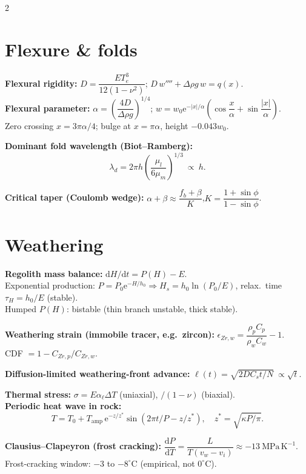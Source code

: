 \documentclass[9pt,a4paper]{extarticle}
\newcommand{\dd}{\mathrm{d}}
\newcommand{\dv}[2]{\dfrac{\dd #1}{\dd #2}}
\newcommand{\ee}{\mathrm{e}}
\begin{document}
\begin{multicols}{2}
\section{Flexure \& folds}
\begin{eqbox}
\textbf{Flexural rigidity:} $D=\dfrac{ET_e^3}{12(1-\nu^2)}$;\quad
$D\,w''''+\Delta\rho g\,w=q(x)$.\\
\textbf{Flexural parameter:} $\alpha=\left(\dfrac{4D}{\Delta\rho g}\right)^{1/4}$;\quad
$w=w_0\ee^{-|x|/\alpha}\!\left(\cos\dfrac x\alpha+\sin\dfrac{|x|}\alpha\right)$.\\
Zero crossing $x=3\pi\alpha/4$; bulge at $x=\pi\alpha$, height $-0.043w_0$.
\end{eqbox}
\begin{eqbox}
\textbf{Dominant fold wavelength (Biot--Ramberg):}
\[
\lambda_d=2\pi h\left(\dfrac{\mu_l}{6\mu_m}\right)^{1/3}\ \propto\ h.
\]
\end{eqbox}
\begin{eqbox}
\textbf{Critical taper (Coulomb wedge):}
$\alpha+\beta\approx\dfrac{f_b+\beta}{K}$,\quad $K=\dfrac{1+\sin\phi}{1-\sin\phi}$.
\end{eqbox}

\section{Weathering}
\begin{eqbox}
\textbf{Regolith mass balance:} $\dd H/\dd t=P(H)-E$.\\
Exponential production: $P=P_0\ee^{-H/h_0}\Rightarrow H_s=h_0\ln(P_0/E)$, relax.\ time $\tau_H=h_0/E$ (stable).\\
Humped $P(H)$: bistable (thin branch unstable, thick stable).
\end{eqbox}
\begin{eqbox}
\textbf{Weathering strain (immobile tracer, e.g.\ zircon):} $\epsilon_{Zr,w}=\dfrac{\rho_pC_p}{\rho_wC_w}-1$.\\
CDF $=1-C_{Zr,p}/C_{Zr,w}$.
\end{eqbox}
\begin{eqbox}
\textbf{Diffusion-limited weathering-front advance:} $\ell(t)=\sqrt{2DC_st/N}\ \propto\sqrt t$.
\end{eqbox}
\begin{eqbox}
\textbf{Thermal stress:} $\sigma=E\alpha_\ell\Delta T$ (uniaxial), $/(1-\nu)$ (biaxial).\\
\textbf{Periodic heat wave in rock:}
\[
T=T_0+T_\mathrm{amp}\,\ee^{-z/z^*}\sin(2\pi t/P-z/z^*),\quad z^*=\sqrt{\kappa P/\pi}.
\]
\end{eqbox}
\begin{eqbox}
\textbf{Clausius--Clapeyron (frost cracking):}
$\dv PT=\dfrac{L}{T(v_w-v_i)}\approx-13\ \mathrm{MPa\,K^{-1}}$.\\
Frost-cracking window: $-3$ to $-8^\circ$C (empirical, not $0^\circ$C).
\end{eqbox}


\end{multicols}
\end{document}
